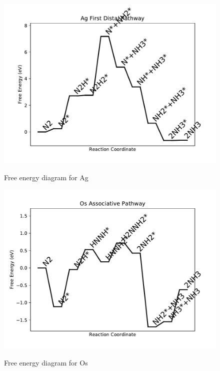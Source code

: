 \documentclass{article}
\begin{document}
\begin{figure}
\includegraphics[width=1\linewidth]{data/plots/Ag_distal_1.pdf}
\label{fig:Ag_distal_1}
\caption{Free energy diagram for Ag}
\end{figure}

\clearpage
\begin{figure}
\includegraphics[width=1\linewidth]{data/plots/Os_associative.pdf}
\label{fig:Os_associative}
\caption{Free energy diagram for Os}
\end{figure}
\end{document}
